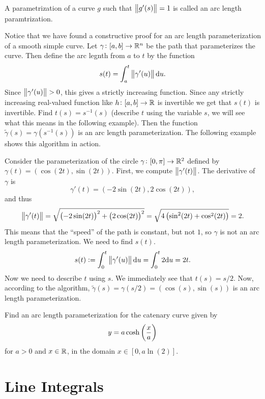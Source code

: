 \documentclass[11pt,a4paper]{article}
\begin{document}
\begin{definition}
  \label{def:arc-length-parameterization}
  A parametrization of a curve $g$ such that $\left\lVert g'(s)\right\rVert = 1$
  is called an arc length paramtrization.
\end{definition}
\begin{remark}
  Notice that we have found a constructive proof for an arc length
  parameterization of a smooth simple curve.
  Let $\gamma \colon [a,b] \to \mathbb{R}^n$ be the path that parameterizes
  the curve.
  Then define the arc legnth from $a$ to $t$ by the function
  \[
    s(t) = \int_{a}^{t} \left\lVert\gamma'(u)\right\rVert \mathrm{d} u.
  \]
  Since $\left\lVert\gamma'(u)\right\rVert > 0$, this gives a strictly increasing
  function.
  Since any strictly increasing real-valued function like
  $h \colon [a,b] \to \mathbb{R}$ is invertible we get that $s(t)$ is invertible.
  Find $t(s) = s^{-1}(s)$ (describe $t$ using the variable $s$, we will
  see what this means in the following example).
  Then the function $\tilde \gamma(s) = \gamma(s^{-1}(s))$
  is an arc length parameterization.
  The following example shows this algorithm in action.
\end{remark}
\begin{example}
  Consider the parameterization of the circle $\gamma \colon [0,\pi] \to \mathbb{R}^2$
  defined by $\gamma(t) = (\cos(2t),\sin(2t))$.
  First, we compute $\left\lVert\gamma'(t)\right\rVert$.
  The derivative of $\gamma$ is
  \[
    \gamma'(t) = (-2\sin(2t),2\cos(2t)),
  \]
  and thus
  \[
    \norm{\gamma'(t)} = \sqrt{\del{-2\sin(2t)}^2 + \del{2\cos(2t)}^2} =
    \sqrt{4 \del{\sin^2(2t) + \cos^2(2t)}} = 2.
  \]
  This means that the ``speed'' of the path is constant, but not $1$,
  so $\gamma$ is not an arc length parameterization.
  We need to find $s(t)$.
  \[
    s(t) :=
    \int_{0}^{t} \left\lVert\gamma'(u)\right\rVert \mathrm{d} u = 
    \int_{0}^{t} 2 \mathrm{d} u = 2t.
  \]
  Now we need to describe $t$ using $s$.
  We immediately see that $t(s) = s/2$.
  Now, according to the algorithm,
  $\tilde \gamma(s) = \gamma(s/2) = (\cos(s),\sin(s))$
  is an arc length parameterization.
\end{example}
\begin{exercise}
  Find an arc length parameterization for the catenary curve
  given by
  \[
    y = a \cosh\del{\frac{x}{a}}
  \]
  for $a > 0$ and $x \in \mathbb{R}$,
  in the domain $x \in [0,a \ln(2)]$.
\end{exercise}

\newpage

\section{Line Integrals}
\end{document}
